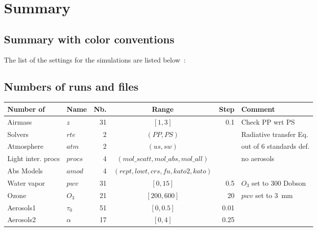 \documentclass[a4paper]{article}
\begin{document}


\section{Summary}
\subsection{Summary with color conventions}
The list of the settings for the simulations are listed below~:

\subsection{Numbers of runs and files}

\begin{table}[h]
{\small
\begin{tabular} {|l|l|r|c|r|l|}  \hline\hline
Number of & Name & Nb. & Range & Step & Comment \\ \hline\hline
Airmass    &   $z$                 &     31     & $[1,3]$ & 0.1   & Check PP wrt PS \\
Solvers     & $rte$             &       2      & $(PP,PS)$ &    &  Radiative transfer Eq. \\
Atmosphere &  $atm$       &     2        &  $(us,sw)$ &   &  out of 6 standards def.\\
Light inter. procs    &  $procs$    &   4          & $(mol\_scatt,mol\_abs,mol\_all)$ & & no aerosols \\
Abs Models  & $amod$  & 4 & $(rept,lowt,crs,fu,kato2,kato)$ & &  \\
Water vapor  & $pwv$    & 31 & $[0,15]$ & 0.5  & $O_3$ set to 300 Dobson \\
Ozone        & $O_3$      & 21  & $[200,600]$ & 20 & $pwv$ set to 3~mm \\ \hline
Aerosols1     &  $\tau_0$  & 51  & $[0,0.5]$   & 0.01 &  \\
Aerosols2     & $\alpha$  &  17 & $[0,4]$ & 0.25 &  \\ \hline 
\hline
\end{tabular}
}
\end{table}
\end{document}
